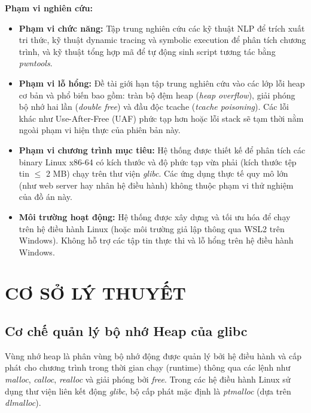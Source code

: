 \documentclass[final]{hcmuitthesis}
\begin{document}
\textbf{Phạm vi nghiên cứu:}
\begin{itemize}
    \item \textbf{Phạm vi chức năng:} Tập trung nghiên cứu các kỹ thuật NLP để trích xuất tri thức, kỹ thuật dynamic tracing và symbolic execution để phân tích chương trình, và kỹ thuật tổng hợp mã để tự động sinh script tương tác bằng \textit{pwntools}.
    \item \textbf{Phạm vi lỗ hổng:} Đề tài giới hạn tập trung nghiên cứu vào các lớp lỗi heap cơ bản và phổ biến bao gồm: tràn bộ đệm heap (\textit{heap overflow}), giải phóng bộ nhớ hai lần (\textit{double free}) và đầu độc tcache (\textit{tcache poisoning}). Các lỗi khác như Use-After-Free (UAF) phức tạp hơn hoặc lỗi stack sẽ tạm thời nằm ngoài phạm vi hiện thực của phiên bản này.
    \item \textbf{Phạm vi chương trình mục tiêu:} Hệ thống được thiết kế để phân tích các binary Linux x86-64 có kích thước và độ phức tạp vừa phải (kích thước tệp tin $\le$ 2 MB) chạy trên thư viện \textit{glibc}. Các ứng dụng thực tế quy mô lớn (như web server hay nhân hệ điều hành) không thuộc phạm vi thử nghiệm của đồ án này.
    \item \textbf{Môi trường hoạt động:} Hệ thống được xây dựng và tối ưu hóa để chạy trên hệ điều hành Linux (hoặc môi trường giả lập thông qua WSL2 trên Windows). Không hỗ trợ các tập tin thực thi và lỗ hổng trên hệ điều hành Windows.
\end{itemize}


\chapter{CƠ SỞ LÝ THUYẾT}

\section{Cơ chế quản lý bộ nhớ Heap của glibc}
Vùng nhớ heap là phân vùng bộ nhớ động được quản lý bởi hệ điều hành và cấp phát cho chương trình trong thời gian chạy (runtime) thông qua các lệnh như \textit{malloc}, \textit{calloc}, \textit{realloc} và giải phóng bởi \textit{free}. Trong các hệ điều hành Linux sử dụng thư viện liên kết động \textit{glibc}, bộ cấp phát mặc định là \textit{ptmalloc} (dựa trên \textit{dlmalloc}).
\end{document}
